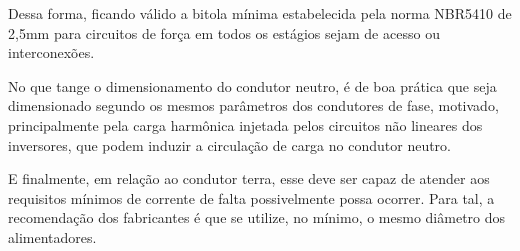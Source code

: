 Dessa forma, ficando válido a bitola mínima estabelecida pela norma NBR5410 de 2,5mm para circuitos de força em todos os estágios sejam de acesso ou interconexões. \cite{NBR5410}

No que tange o dimensionamento do condutor neutro, é de boa prática que seja dimensionado segundo os mesmos parâmetros dos condutores de fase, motivado, principalmente pela carga harmônica injetada pelos circuitos não lineares dos inversores, que podem induzir a circulação de carga no condutor neutro.

    E finalmente, em relação ao condutor terra, esse deve ser capaz de atender aos requisitos mínimos de corrente de falta possivelmente possa ocorrer. Para tal, a recomendação dos fabricantes é que se utilize, no mínimo, o mesmo diâmetro dos alimentadores.

    
    


     





